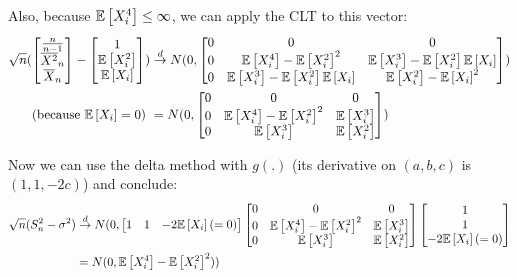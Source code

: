 \documentclass[12pt]{paper}
\begin{document}
 Also, because $\exV{X_i^4}\le \infty$, we can apply the CLT to this vector:
 \begin{equation}
 \begin{split}
 \sqrt{n}(\begin{bmatrix}
 \frac{n}{n-1}\\
 \overline{X^2}_n\\
 \overline{X}_n\\
 \end{bmatrix}-
 \begin{bmatrix}
 1\\
 \exV{X_i^2}\\
 \exV{X_i}\\
  \end{bmatrix}
 )&\overset{d}{\to} N(0,
 \begin{bmatrix}
 0&0&0\\
 0&\exV{X_i^4}-\exV{X_i^2}^2&\exV{X_i^3}-\exV{X_i^2}\exV{X_i}\\
 0&  \exV{X_i^3}-\exV{X_i^2}\exV{X_i}&\exV{X_i^2}-\exV{X_i}^2\\
  \end{bmatrix}
 )\\
\text{(because $\exV{X_i}=0$)    } &=N(0,
 \begin{bmatrix}
 0&0&0\\
 0&\exV{X_i^4}-\exV{X_i^2}^2&\exV{X_i^3}\\
 0&  \exV{X_i^3}&\exV{X_i^2}\\
\end{bmatrix}
 )
\end{split}
\end{equation}

Now we can use the delta method with $g(.)$ (its derivative on $(a,b,c)$ is $(1,1,-2c)$) and conclude:
 \begin{equation}
 \begin{split}
 \sqrt{n}(S_n^2-\sigma^2)&\overset{d}{\to}N(0,\begin{bmatrix}
 1&1&-2\exV{X_i}(=0)\\
 \end{bmatrix}
 \begin{bmatrix}
 0&0&0\\
 0&\exV{X_i^4}-\exV{X_i^2}^2&\exV{X_i^3}\\
 0&  \exV{X_i^3}&\exV{X_i^2}\\
\end{bmatrix}
\begin{bmatrix}
 1\\
 1\\
 -2\exV{X_i}(=0)\\
 \end{bmatrix}\\
 &=N(0,\exV{X_i^4}-\exV{X_i^2}^2 )
)
\end{split}
\end{equation}
\end{document}
